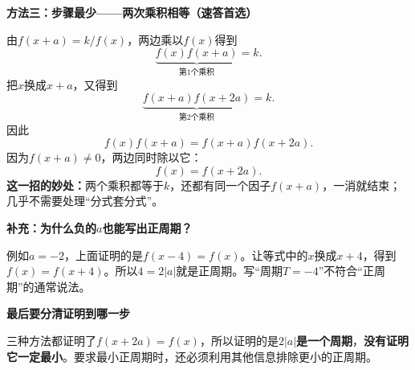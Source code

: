 \clearpage
\begin{proofbox}
\textbf{\textcolor{CProof}{方法三：步骤最少——两次乘积相等（速答首选）}}



由$f(x+a)=k/f(x)$，两边乘以$f(x)$得到
\[
\underbrace{f(x)f(x+a)}_{\text{第1个乘积}}=k.
\tag{1}
\]
把$x$换成$x+a$，又得到
\[
\underbrace{f(x+a)f(x+2a)}_{\text{第2个乘积}}=k.
\tag{2}
\]
因此
\[
 f(x)f(x+a)=f(x+a)f(x+2a).
\]
因为$f(x+a)\ne0$，两边同时除以它：
\[
\boxed{f(x)=f(x+2a)}.
\]
\textbf{这一招的妙处：}两个乘积都等于$k$，还都有同一个因子$f(x+a)$，一消就结束；几乎不需要处理“分式套分式”。

\medskip
\end{proofbox}\clearpage\begin{proofbox}\textbf{\textcolor{CProof}{补充：为什么负的$a$也能写出正周期？}}



例如$a=-2$，上面证明的是$f(x-4)=f(x)$。让等式中的$x$换成$x+4$，得到$f(x)=f(x+4)$。所以$4=2|a|$就是正周期。写“周期$T=-4$”不符合“正周期”的通常说法。

\medskip
\textbf{\textcolor{CProof}{最后要分清证明到哪一步}}

三种方法都证明了\(f(x+2a)=f(x)\)，所以证明的是\textbf{$2|a|$是一个周期}，\textbf{没有证明它一定最小}。要求最小正周期时，还必须利用其他信息排除更小的正周期。
\end{proofbox}
